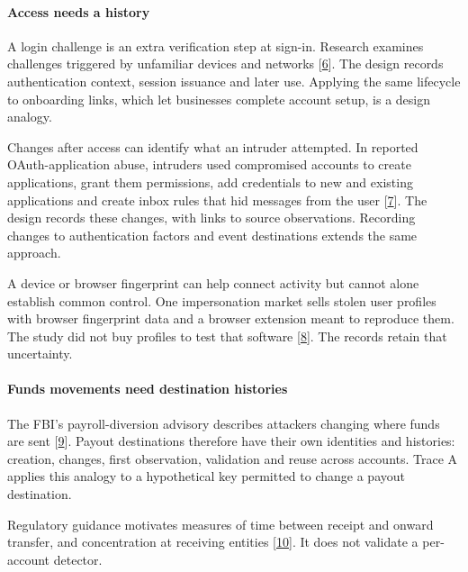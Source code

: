 \documentclass[
  11pt,
]{article}
\begin{document}
\hypertarget{access-needs-a-history}{%
\paragraph{Access needs a history}\label{access-needs-a-history}}

A login challenge is an extra verification step at sign-in. Research
examines challenges triggered by unfamiliar devices and networks
{[}\protect\hyperlink{ref-Doerfler2019}{6}{]}. The design records
authentication context, session issuance and later use. Applying the
same lifecycle to onboarding links, which let businesses complete
account setup, is a design analogy.

Changes after access can identify what an intruder attempted. In
reported OAuth-application abuse, intruders used compromised accounts to
create applications, grant them permissions, add credentials to new and
existing applications and create inbox rules that hid messages from the
user {[}\protect\hyperlink{ref-Microsoft2023OAuth}{7}{]}. The design
records these changes, with links to source observations. Recording
changes to authentication factors and event destinations extends the
same approach.

A device or browser fingerprint can help connect activity but cannot
alone establish common control. One impersonation market sells stolen
user profiles with browser fingerprint data and a browser extension
meant to reproduce them. The study did not buy profiles to test that
software {[}\protect\hyperlink{ref-Campobasso2020}{8}{]}. The records
retain that uncertainty.

\hypertarget{funds-movements-need-destination-histories}{%
\paragraph{Funds movements need destination
histories}\label{funds-movements-need-destination-histories}}

The FBI's payroll-diversion advisory describes attackers changing where
funds are sent {[}\protect\hyperlink{ref-FBI2018}{9}{]}. Payout
destinations therefore have their own identities and histories:
creation, changes, first observation, validation and reuse across
accounts. Trace A applies this analogy to a hypothetical key permitted
to change a payout destination.

Regulatory guidance motivates measures of time between receipt and
onward transfer, and concentration at receiving entities
{[}\protect\hyperlink{ref-FinCEN2014}{10}{]}. It does not validate a
per-account detector.
\end{document}
